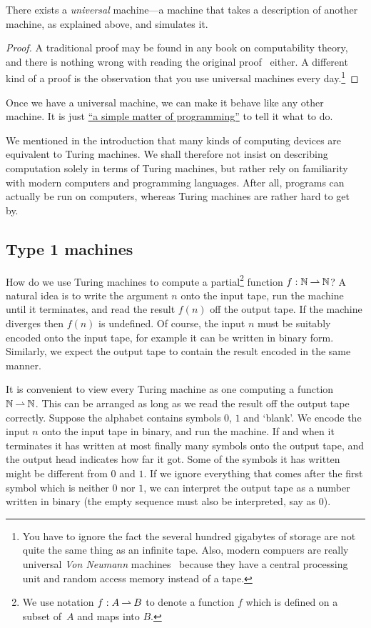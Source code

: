 \begin{theorem}[Turing]
  There exists a \emph{universal} machine---a machine that takes a
  description of another machine, as explained above, and simulates
  it.
\end{theorem}

\begin{proof}
  A traditional proof may be found in any book on computability
  theory, and there is nothing wrong with reading the original
  proof~\cite{Turing} either. A different kind of a proof is the
  observation that you use universal machines every day.\footnote{You
    have to ignore the fact the several hundred gigabytes of storage
    are not quite the same thing as an infinite tape. Also, modern
    compuers are really universal \emph{Von Neumann}
    machines~\cite{vonNeumann} because they have a central processing
    unit and random access memory instead of a tape.}
\end{proof}

Once we have a universal machine, we can make it behave like any other
machine. It is just
\href{http://www.catb.org/jargon/html/S/SMOP.html}{``a simple matter
  of programming''} to tell it what to do.

We mentioned in the introduction that many kinds of computing devices
are equivalent to Turing machines. We shall therefore not insist on
describing computation solely in terms of Turing machines, but rather
rely on familiarity with modern computers and programming languages.
After all, programs can actually be run on computers, whereas Turing
machines are rather hard to get by.


\subsection{Type 1 machines}
\label{sec:type-1}

How do we use Turing machines to compute a partial\footnote{We use
  notation $f : A \mathbin{\rightharpoonup} B$ to denote a function $f$ which is defined
  on a subset of~$A$ and maps into $B$.} function $f : \mathbb{N} \mathbin{\rightharpoonup}
\mathbb{N}$? A natural idea is to write the argument $n$ onto the input tape,
run the machine until it terminates, and read the result $f(n)$ off
the output tape. If the machine diverges then $f(n)$ is undefined. Of
course, the input $n$ must be suitably encoded onto the input tape,
for example it can be written in binary form. Similarly, we expect the
output tape to contain the result encoded in the same manner.

It is convenient to view every Turing machine as one computing a
function $\mathbb{N} \mathbin{\rightharpoonup} \mathbb{N}$. This can be arranged as long as we read the
result off the output tape correctly. Suppose the alphabet contains
symbols $0$, $1$ and `blank'. We encode the input $n$ onto the input
tape in binary, and run the machine. If and when it terminates it has
written at most finally many symbols onto the output tape, and the
output head indicates how far it got. Some of the symbols it has
written might be different from $0$ and $1$. If we ignore everything
that comes after the first symbol which is neither $0$ nor $1$, we can
interpret the output tape as a number written in binary (the empty
sequence must also be interpreted, say as $0$).

